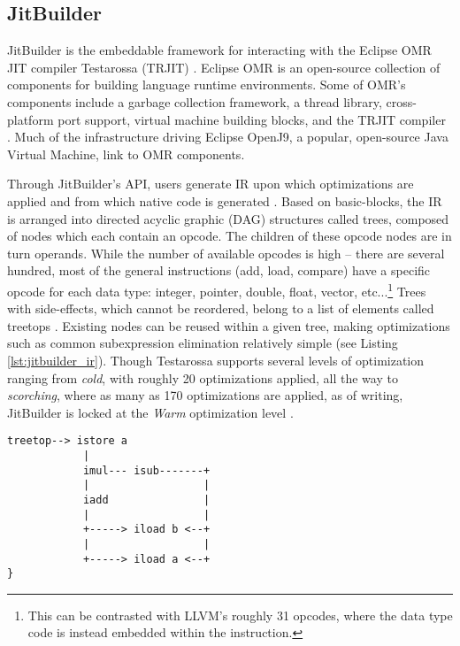 \subsection{JitBuilder}
\label{sec:jitbuilder}
JitBuilder is the embeddable framework for interacting with the Eclipse OMR JIT compiler Testarossa (TRJIT) \cite{jitbuilderPaper}.
Eclipse OMR is an open-source collection of components for building language runtime environments.
Some of OMR's components include a garbage collection framework, a thread library, cross-platform port support, virtual machine building blocks, and the TRJIT compiler \cite{eclipseOMR,RebuildingAirliner}.
Much of the infrastructure driving Eclipse OpenJ9, a popular, open-source Java Virtual Machine, link to OMR components.

Through JitBuilder's API, users generate IR upon which optimizations are applied and from which native code is generated \cite{SuganumaIBMJit}.
Based on basic-blocks, the IR is arranged into directed acyclic graphic (DAG) structures called trees, composed of nodes which each contain an opcode.
The children of these opcode nodes are in turn operands.
While the number of available opcodes is high -- there are several hundred, most of the general instructions (add, load, compare) have a specific opcode for each data type: integer, pointer, double, float, vector, etc...\footnote{
    This can be contrasted with LLVM's roughly 31 opcodes, where the data type code is instead embedded within the instruction.
}
Trees with side-effects, which cannot be reordered, belong to a list of elements called treetops \cite{treetops}.
Existing nodes can be reused within a given tree, making optimizations such as common subexpression elimination relatively simple (see Listing \ref{lst:jitbuilder_ir}).
Though Testarossa supports several levels of optimization ranging from \textit{cold}, with roughly 20 optimizations applied, all the way to \textit{scorching}, where as many as 170 optimizations are applied, as of writing, JitBuilder is locked at the \textit{Warm} optimization level \cite{sanchez2011using, jitbuilderWarm}.
\begin{lstlisting}[float,floatplacement=H,
caption={OMR IR representation for (a+b)*(a-b). Note that the iload nodes are reused \cite{treetops}.},
label=lst:jitbuilder_ir]
treetop--> istore a
            |
            imul--- isub-------+
            |                  |
            iadd               |
            |                  |
            +-----> iload b <--+
            |                  |
            +-----> iload a <--+
}\end{lstlisting}

